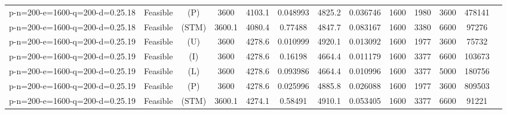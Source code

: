 \documentclass[landscape, a4paper]{article}
\newcommand{\STM}{\ensuremath{\mathrm{STM}}}
\newcommand{\Improved}{\ensuremath{\mathrm{I}}}
\newcommand{\Loose}{\ensuremath{\mathrm{L}}}
\newcommand{\Profit}{\ensuremath{\mathrm{P}}}
\newcommand{\Utility}{\ensuremath{\mathrm{U}}}
\begin{document}
\begin{center}
\begin{tabular}{lcccccccccccc}
p-n=200-e=1600-q=200-d=0.25.18 & Feasible & (\Profit) & 3600 & 4103.1 & 0.048993 & 4825.2 & 0.036746 & 1600 & 1980 & 3600 & 478141 & \\
p-n=200-e=1600-q=200-d=0.25.18 & Feasible & (\STM) & 3600.1 & 4080.4 & 0.77488 & 4847.7 & 0.083167 & 1600 & 3380 & 6600 & 97276 & \\
p-n=200-e=1600-q=200-d=0.25.19 & Feasible & (\Utility) & 3600 & 4278.6 & 0.010999 & 4920.1 & 0.013092 & 1600 & 1977 & 3600 & 75732 & \\
p-n=200-e=1600-q=200-d=0.25.19 & Feasible & (\Improved) & 3600 & 4278.6 & 0.16198 & 4664.4 & 0.011179 & 1600 & 3377 & 6600 & 103673 & \\
p-n=200-e=1600-q=200-d=0.25.19 & Feasible & (\Loose) & 3600 & 4278.6 & 0.093986 & 4664.4 & 0.010996 & 1600 & 3377 & 5000 & 180756 & \\
p-n=200-e=1600-q=200-d=0.25.19 & Feasible & (\Profit) & 3600 & 4278.6 & 0.025996 & 4885.8 & 0.026088 & 1600 & 1977 & 3600 & 809503 & \\
p-n=200-e=1600-q=200-d=0.25.19 & Feasible & (\STM) & 3600.1 & 4274.1 & 0.58491 & 4910.1 & 0.053405 & 1600 & 3377 & 6600 & 91221 & \\
\end{tabular}
\end{center}
\end{document}
